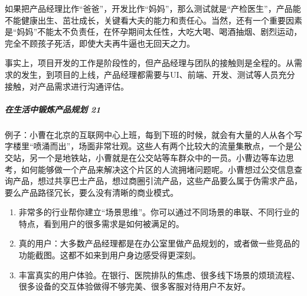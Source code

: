 \documentclass[letterpaper,11pt,english]{sphinxmanual}
\begin{document}
如果把产品经理比作“爸爸”，开发比作“妈妈”，那么测试就是“产检医生”，产品能不能健康出生、茁壮成长，关键看大夫的能力和责任心。当然，还有一个重要因素是“妈妈”不能太不负责任，在怀孕期间太任性，大吃大喝、喝酒抽烟、剧烈运动，完全不顾孩子死活，即使大夫再牛逼也无回天之力。%
\begin{footnote}[150]\sphinxAtStartFootnote
{}
%
\end{footnote}

事实上，项目开发的工作是阶段性的，但产品经理与团队的接触则是全程的。从需求的发生，到项目的上线，产品经理都需要与UI、前端、开发、测试等人员充分接触，对产品需求进行沟通评估。


\subparagraph{在生活中锻炼产品规划 21\sphinxfootnotemark[151]}
\label{\detokenize{chapter_introduction/PM:id32}}%
\begin{footnotetext}[151]\sphinxAtStartFootnote
{}
%
\end{footnotetext}\ignorespaces 
例子：小曹在北京的互联网中心上班，每到下班的时候，就会有大量的人从各个写字楼里“喷涌而出”，场面非常壮观。这些人有两个比较大的流量集散点，一个是公交站，另一个是地铁站，小曹就是在公交站等车群众中的一员。小曹边等车边思考，如何能够做一个产品来解决这个片区的人流拥堵问题呢。小曹想过公交信息查询产品，想过共享巴士产品，想过商圈引流产品，这些产品要么属于伪需求产品，要么产品路径冗长，要么没有清晰的商业模式。
\begin{enumerate}
%
\item {} 
非常多的行业帮你建立“场景思维”。你可以通过不同场景的串联、不同行业的特点，看到用户的很多需求是如何被满足的。

\item {} 
真的用户：大多数产品经理都是在办公室里做产品规划的，或者做一些竞品的功能截图。这都不如来到用户身边感受得更深刻。

\item {} 
丰富真实的用户体验。在银行、医院排队的焦虑、很多线下场景的烦琐流程、很多设备的交互体验做得不够完美、很多客服对待用户不友好。

\end{enumerate}
\end{document}
